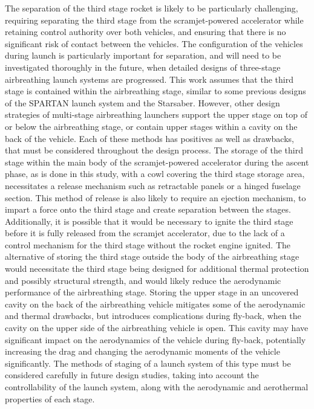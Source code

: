 The separation of the third stage rocket is likely to be particularly challenging, requiring separating the third stage from the scramjet-powered accelerator while retaining control authority over both vehicles, and ensuring that there is no significant risk of contact between the vehicles. The configuration of the vehicles during launch is particularly important for separation, and will need to be investigated thoroughly in the future, when detailed designs of three-stage airbreathing launch systems are progressed. This work assumes that the third stage is contained within the airbreathing stage, similar to some previous designs of the SPARTAN launch system\cite{Jazra2013} and the Starsaber\cite{Germain2001}. However, other design strategies of multi-stage airbreathing launchers support the upper stage on top of\cite{Gong2014,Tsuchiya2005} or below\cite{Takahashi1997} the airbreathing stage, or contain upper stages within a cavity on the back of the vehicle\cite{Preller2017b,Mehta2001,Wilhite1991}. Each of these methods has positives as well as drawbacks, that must be considered throughout the design process.
The storage of the third stage within the main body of the scramjet-powered accelerator during the ascent phase, as is done in this study, with a cowl covering the third stage storage area, necessitates a release mechanism such as retractable panels or a hinged fuselage section. This method of release is also likely to require an ejection mechanism, to impart a force onto the third stage and create separation between the stages. Additionally, it is possible that it would be necessary to ignite the third stage before it is fully released from the scramjet accelerator, due to the lack of a control mechanism for the third stage without the rocket engine ignited. 
The alternative of storing the third stage outside the body of the airbreathing stage would necessitate the third stage being designed for additional thermal protection and possibly structural strength, and would likely reduce the aerodynamic performance of the airbreathing stage. Storing the upper stage in an uncovered cavity on the back of the airbreathing vehicle mitigates some of the aerodynamic and thermal drawbacks, but introduces complications during fly-back, when the cavity on the upper side of the airbreathing vehicle is open. This cavity may have significant impact on the aerodynamics of the vehicle during fly-back, potentially increasing the drag and changing the aerodynamic moments of the vehicle significantly. 
The methods of staging of a launch system of this type must be considered carefully in future design studies, taking into account the controllability of the launch system, along with the aerodynamic and aerothermal properties of each stage. 

